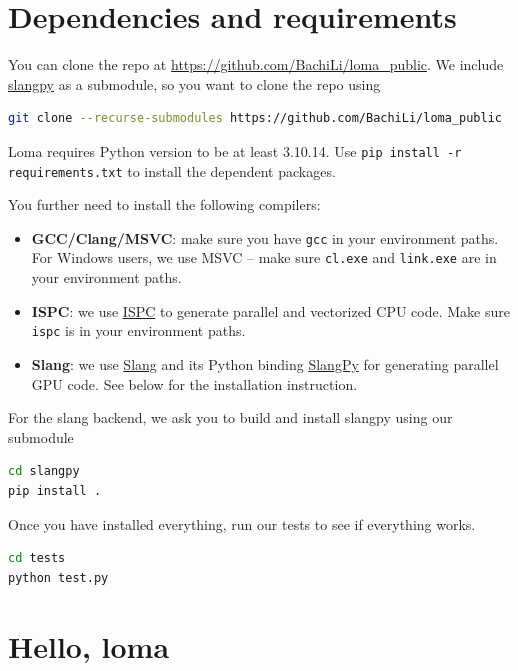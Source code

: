 \section{Dependencies and requirements}

You can clone the repo at \url{https://github.com/BachiLi/loma_public}. We include \href{https://github.com/shader-slang/slangpy}{slangpy} as a submodule, so you want to clone the repo using 
\begin{lstlisting}[language=bash]
git clone --recurse-submodules https://github.com/BachiLi/loma_public
\end{lstlisting}

Loma requires Python version to be at least 3.10.14. 
Use \lstinline{pip install -r requirements.txt} to install the dependent packages.

You further need to install the following compilers:
\begin{itemize}
    \item \textbf{GCC/Clang/MSVC}: make sure you have \lstinline{gcc} in your environment paths. For Windows users, we use MSVC -- make sure \lstinline{cl.exe} and \lstinline{link.exe} are in your environment paths.
    \item \textbf{ISPC}: we use \href{https://ispc.github.io/}{ISPC} to generate parallel and vectorized CPU code. Make sure \lstinline{ispc} is in your environment paths.
    \item \textbf{Slang}: we use \href{https://shader-slang.org/}{Slang} and its Python binding \href{https://slangpy.shader-slang.org/}{SlangPy} for generating parallel GPU code. See below for the installation instruction.
\end{itemize}

For the slang backend, we ask you to build and install slangpy using our submodule
\begin{lstlisting}[language=bash]
cd slangpy
pip install .
\end{lstlisting}

Once you have installed everything, run our tests to see if everything works.
\begin{lstlisting}[language=bash]
cd tests
python test.py
\end{lstlisting}

\section{Hello, loma}

